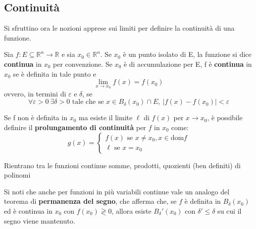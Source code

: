 \subsection{Continuità}
Si sfruttino ora le nozioni apprese sui limiti per definire la continuità di una funzione.
\begin{definition} \label{Def: Continuità}
    Sia $f: E \subseteq \mathbb{R}^n \to \mathbb{R}$ e sia $x_0 \in \mathbb{R}^n$. Se $x_0$ è un punto isolato di E, la funzione si dice \textbf{continua} in $x_0$ per convenzione. Se $x_0$ è di accumulazione per E, f è \textbf{continua} in $x_0$ se è definita in tale punto e
    \begin{equation} \label{Eq: Continuità}
        \lim_{x \to x_0} f(x)= f(x_0)
    \end{equation}
    ovvero, in termini di $\varepsilon$ e $\delta$, se
    \begin{equation}
        \forall \varepsilon > 0 \  \exists \delta>0 \text{ tale che se } x \in B_\delta(x_0) \cap E, \ |f(x)-f(x_0)|< \varepsilon
    \end{equation}
    \end{definition}
    \begin{oss}
        Se f non è definita in $x_0$ ma esiste il limite $\ell$ di $f(x)$ per $x \to x_0$, è possibile definire il \textbf{prolungamento di continuità} per $f$ in $x_0$ come:
        \begin{equation}
            g(x) = \begin{cases}
                f(x) \text{ se } x \neq x_0, x \in \text{dom}f\\
                \ell \text { se } x=x_0
            \end{cases}
        \end{equation}
    \end{oss}
    \begin{oss}
        Rientrano tra le funzioni continue somme, prodotti, quozienti (ben definiti) di polinomi
    \end{oss}
\vspace*{\baselineskip}
Si noti che anche per funzioni in più variabili continue vale un analogo del teorema di \textbf{permanenza del segno}, che afferma che, se $f$ è definita in $B_\delta(x_0)$ ed è continua in $x_0$ con $f(x_0) \gtrless 0$, allora esiste $B_\delta'(x_0)$ con $\delta' \leq \delta$ su cui il segno viene mantenuto.
